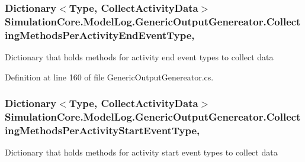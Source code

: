 \subsubsection[{\texorpdfstring{Collecting\+Methods\+Per\+Activity\+End\+Event\+Type}{CollectingMethodsPerActivityEndEventType}}]{\setlength{\rightskip}{0pt plus 5cm}Dictionary$<$Type, {\bf Collect\+Activity\+Data}$>$ Simulation\+Core.\+Model\+Log.\+Generic\+Output\+Genereator.\+Collecting\+Methods\+Per\+Activity\+End\+Event\+Type\hspace{0.3cm}{\ttfamily [get]}, {\ttfamily [protected]}}\hypertarget{class_simulation_core_1_1_model_log_1_1_generic_output_genereator_ab16081627424a7d2473c64cf2d7e96ed}{}\label{class_simulation_core_1_1_model_log_1_1_generic_output_genereator_ab16081627424a7d2473c64cf2d7e96ed}


Dictionary that holds methods for activity end event types to collect data 



Definition at line 160 of file Generic\+Output\+Genereator.\+cs.

\subsubsection[{\texorpdfstring{Collecting\+Methods\+Per\+Activity\+Start\+Event\+Type}{CollectingMethodsPerActivityStartEventType}}]{\setlength{\rightskip}{0pt plus 5cm}Dictionary$<$Type, {\bf Collect\+Activity\+Data}$>$ Simulation\+Core.\+Model\+Log.\+Generic\+Output\+Genereator.\+Collecting\+Methods\+Per\+Activity\+Start\+Event\+Type\hspace{0.3cm}{\ttfamily [get]}, {\ttfamily [protected]}}\hypertarget{class_simulation_core_1_1_model_log_1_1_generic_output_genereator_abec6fe77c7647337b06ca8b19a1a5b2f}{}\label{class_simulation_core_1_1_model_log_1_1_generic_output_genereator_abec6fe77c7647337b06ca8b19a1a5b2f}


Dictionary that holds methods for activity start event types to collect data 



